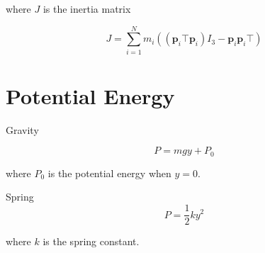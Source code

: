 \documentclass{article}[10pt]
\begin{document}
where $J$ is the inertia matrix

$$ J = \sum^N_{i=1} m_i((\mathbf{p}_i \top \mathbf{p}_i)I_3 - \mathbf{p}_i\mathbf{p}_i\top) $$


\section*{\hfil Potential Energy \hfil}

Gravity

\begin{equation}
P=mgy + P_0
\end{equation}

where $P_0$ is the potential energy when $y = 0$.

Spring
\begin{equation}
P=\frac{1}{2}ky^2
\end{equation}

\noindent
where $k$ is the spring constant.
\end{document}
